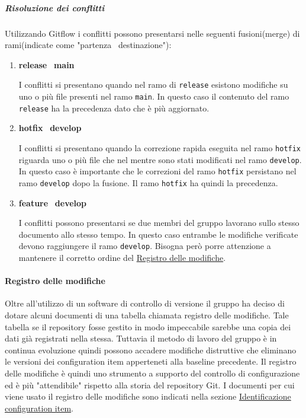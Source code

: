 \subparagraph{Risoluzione dei conflitti}
\label{subpar:risoluzione_dei_conflitti}
Utilizzando Gitflow i conflitti possono presentarsi nelle seguenti fusioni(merge) di rami(indicate come "partenza \textrightarrow\ destinazione"):
\begin{enumerate}
    \item \textbf{release} \textrightarrow\ \textbf{main}
    
    I conflitti si presentano quando nel ramo di \texttt{release} esistono modifiche su uno o più file presenti nel ramo \texttt{main}.
    In questo caso il contenuto del ramo \texttt{release} ha la precedenza dato che è più aggiornato.
    
    \item \textbf{hotfix} \textrightarrow\ \textbf{develop}
    
    I conflitti si presentano quando la correzione rapida eseguita nel ramo \texttt{hotfix} riguarda uno o più file che nel mentre sono stati modificati nel ramo \texttt{develop}.
    In questo caso è importante che le correzioni del ramo \texttt{hotfix} persistano nel ramo \texttt{develop} dopo la fusione.
    Il ramo \texttt{hotfix} ha quindi la precedenza.   


    \item \textbf{feature} \textrightarrow\ \textbf{develop}
   
    I conflitti possono presentarsi se due membri del gruppo lavorano sullo stesso documento allo stesso tempo.
    In questo caso entrambe le modifiche verificate devono raggiungere il ramo \texttt{develop}.
    Bisogna però porre attenzione a mantenere il corretto ordine del \hyperref[par:registro_delle_modifiche]{Registro delle modifiche}.
\end{enumerate}


\paragraph{Registro delle modifiche}
\label{par:registro_delle_modifiche}
Oltre all'utilizzo di un software di controllo di versione il gruppo ha deciso di dotare alcuni documenti di una tabella chiamata registro delle modifiche.
Tale tabella se il repository fosse gestito in modo impeccabile sarebbe una copia dei dati già registrati nella stessa.
Tuttavia il metodo di lavoro del gruppo è in continua evoluzione quindi possono accadere modifiche distruttive che eliminano le versioni dei configuration item apperteneti alla baseline precedente.
Il registro delle modifiche è quindi uno strumento a supporto del controllo di configurazione ed è più "attendibile" rispetto alla storia del repository Git.
I documenti per cui viene usato il registro delle modifiche sono indicati nella sezione \hyperref[subsubsec:identificazione_CI]{Identificazione configuration item}.

